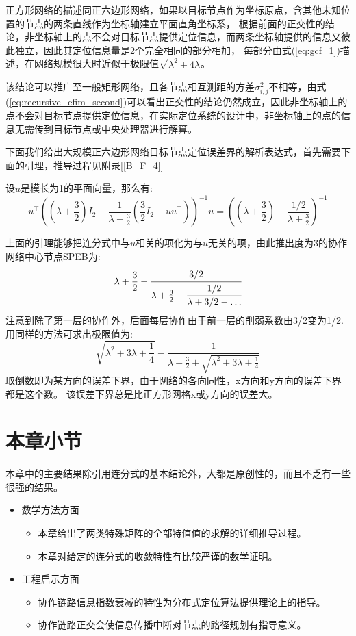 正方形网络的描述同正六边形网络，如果以目标节点作为坐标原点，含其他未知位置的节点的两条直线作为坐标轴建立平面直角坐标系，
根据前面的正交性的结论，非坐标轴上的点不会对目标节点提供定位信息，而两条坐标轴提供的信息又彼此独立，因此其定位信息量是2个完全相同的部分相加，
每部分由式(\ref{eq:gcf_1})描述，在网络规模很大时近似于极限值$\sqrt{\lambda^2+4\lambda}$。

该结论可以推广至一般矩形网络，且各节点相互测距的方差$\sigma^2_{i,j}$不相等，由式(\ref{eq:recursive_efim_second})可以看出正交性的结论仍然成立，因此非坐标轴上的点不会对目标节点提供定位信息，在实际定位系统的设计中，非坐标轴上的点的信息无需传到目标节点或中央处理器进行解算。

下面我们给出大规模正六边形网络目标节点定位误差界的解析表达式，首先需要下面的引理，推导过程见附录[\ref{B_F_4}]
\begin{lemma}\label{lemma:hexagon}
  设$u$是模长为1的平面向量，那么有:
\begin{equation}\label{eq:equiv}
  u^\intercal ((\lambda+\frac{3}{2})I_2-\frac{1}{\lambda+\frac{3}{2}}(\frac{3}{2}I_2-uu^\intercal ))^{-1}u
  =((\lambda+\frac{3}{2})-\frac{1/2}{\lambda+\frac{3}{2}})^{-1}
\end{equation}
\end{lemma}
  上面的引理能够把连分式中与$u$相关的项化为与$u$无关的项，由此推出度为3的协作网络中心节点SPEB为:
  \[
\lambda+\frac{3}{2}-\cfrac{3/2}{\lambda+\frac{3}{2}-\cfrac{1/2}{\lambda+3/2-\dots}}
  \]
  注意到除了第一层的协作外，后面每层协作由于前一层的削弱系数由3/2变为1/2.
  用同样的方法可求出极限值为:
  \[
  \sqrt{\lambda^2+3\lambda+\frac{1}{4}}-\frac{1}{\lambda+\frac{3}{2}+\sqrt{\lambda^2+3\lambda+\frac{1}{4}}}
  \]
  取倒数即为某方向的误差下界，由于网络的各向同性，x方向和y方向的误差下界都是这个数。
该误差下界总是比正方形网格x或y方向的误差大。

\section{本章小节}\label{section:conclusion4}
   本章中的主要结果除引用连分式的基本结论外，大都是原创性的，而且不乏有一些很强的结果。
  \begin{itemize}
  \item
  数学方法方面
  \begin{itemize}
  \item 本章给出了两类特殊矩阵的全部特值值的求解的详细推导过程。
  \item 本章对给定的连分式的收敛特性有比较严谨的数学证明。
  \end{itemize}
  \item
  工程启示方面
  \begin{itemize}
  \item
    协作链路信息指数衰减的特性为分布式定位算法提供理论上的指导。
  \item
    协作链路正交会使信息传播中断对节点的路径规划有指导意义。
  \end{itemize}
  \end{itemize}
